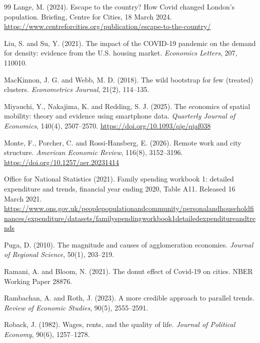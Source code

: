 \documentclass[11pt,a4paper]{article}
\begin{document}
\begin{thebibliography}{99}
Lange, M. (2024). Escape to the country? How Covid changed London's population. Briefing, Centre for Cities, 18 March 2024. \url{https://www.centreforcities.org/publication/escape-to-the-country/}

Liu, S. and Su, Y. (2021). The impact of the COVID-19 pandemic on the demand for density: evidence from the U.S. housing market. \textit{Economics Letters}, 207, 110010.

MacKinnon, J. G. and Webb, M. D. (2018). The wild bootstrap for few (treated) clusters. \textit{Econometrics Journal}, 21(2), 114--135.

Miyauchi, Y., Nakajima, K. and Redding, S. J. (2025). The economics of spatial mobility: theory and evidence using smartphone data. \textit{Quarterly Journal of Economics}, 140(4), 2507--2570. \url{https://doi.org/10.1093/qje/qjaf038}

Monte, F., Porcher, C. and Rossi-Hansberg, E. (2026). Remote work and city structure. \textit{American Economic Review}, 116(8), 3152--3196. \url{https://doi.org/10.1257/aer.20231414}

Office for National Statistics (2021). Family spending workbook 1: detailed expenditure and trends, financial year ending 2020, Table A11. Released 16 March 2021. \url{https://www.ons.gov.uk/peoplepopulationandcommunity/personalandhouseholdfinances/expenditure/datasets/familyspendingworkbook1detailedexpenditureandtrends}

Puga, D. (2010). The magnitude and causes of agglomeration economies. \textit{Journal of Regional Science}, 50(1), 203--219.

Ramani, A. and Bloom, N. (2021). The donut effect of Covid-19 on cities. NBER Working Paper 28876.

Rambachan, A. and Roth, J. (2023). A more credible approach to parallel trends. \textit{Review of Economic Studies}, 90(5), 2555--2591.

Roback, J. (1982). Wages, rents, and the quality of life. \textit{Journal of Political Economy}, 90(6), 1257--1278.


\end{thebibliography}
\end{document}
